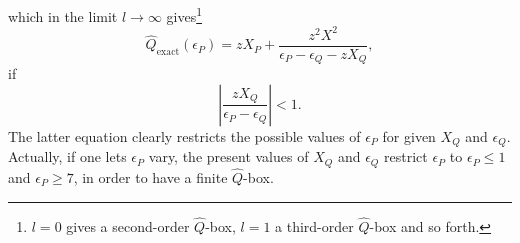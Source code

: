which in the limit $l\rightarrow \infty$ 
gives\footnote{$l=0$ gives a second-order $\hat{Q}$-box, $l=1$ a third-order
$\hat{Q}$-box and so forth.} 
\begin{equation}
      \hat{Q}_{\mathrm{exact}}(\epsilon_P)=
      zX_P+\frac{z^2X^2}{\epsilon_P -\epsilon_Q-zX_Q},
      \label{eq:qexact}
\end{equation}
if
\begin{equation}
     \left|\frac{zX_Q}{\epsilon_P-\epsilon_Q}\right| < 1.
     \label{eq:constr}
\end{equation}
The latter equation clearly restricts the possible 
values of $\epsilon_P$ for
given $X_Q$ and $\epsilon_Q$. Actually, 
if one lets $\epsilon_P$ vary, the present values of
$X_Q$ and $\epsilon_Q$ restrict  $\epsilon_P$ to 
$\epsilon_P \leq 1$ and $\epsilon_P\geq 7$, in order 
to have a finite $\hat{Q}$-box.
 
